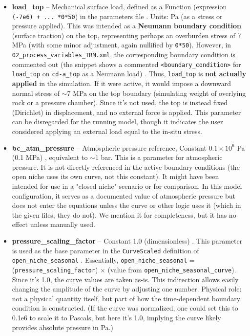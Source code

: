 \documentclass[10pt,a4paper]{article}
\begin{document}
\begin{itemize}
    \item \textbf{load\_top} -- Mechanical surface load, defined as a Function (expression \texttt{(-7e6) + ... *0*50}) in the parameters file \cite{file:03_parameters_TRM}. Units: Pa (as a stress or pressure applied). This was intended as a \textbf{Neumann boundary condition} (surface traction) on the top, representing perhaps an overburden stress of 7 MPa (with some minor adjustment, again nullified by \texttt{0*50}). However, in \texttt{02\_process\_variables\_TRM.xml}, the corresponding boundary condition is commented out (the snippet shows a commented \texttt{<boundary\_condition>} for \texttt{load\_top} on \texttt{cd-a\_top} as a Neumann load) \cite{file:02_process_variables_TRM}. Thus, \texttt{load\_top} is \textbf{not actually applied} in the simulation. If it were active, it would impose a downward normal stress of $\sim$7 MPa on the top boundary (simulating weight of overlying rock or a pressure chamber). Since it's not used, the top is instead fixed (Dirichlet) in displacement, and no external force is applied. This parameter can be disregarded for the running model, though it indicates the user considered applying an external load equal to the in-situ stress.

    \item \textbf{bc\_atm\_pressure} -- Atmospheric pressure reference, Constant $0.1 \times 10^6$ Pa (0.1 MPa) \cite{file:03_parameters_TRM}, equivalent to $\sim$1 bar. This is a parameter for atmospheric pressure. It is not directly referenced in the active boundary conditions (the open niche uses its own curve, not this constant). It might have been intended for use in a "closed niche" scenario or for comparison. In this model configuration, it serves as a documented value of atmospheric pressure but does not enter the equations unless the curve or other logic uses it (which in the given files, they do not). We mention it for completeness, but it has no effect unless manually used.

    \item \textbf{pressure\_scaling\_factor} -- Constant 1.0 (dimensionless) \cite{file:03_parameters_TRM}. This parameter is used as the base parameter in the \texttt{CurveScaled} definition of \texttt{open\_niche\_seasonal} \cite{file:03_parameters_TRM}. Essentially, \texttt{open\_niche\_seasonal} = (\texttt{pressure\_scaling\_factor}) $\times$ (value from \texttt{open\_niche\_seasonal\_curve}). Since it's 1.0, the curve values are taken as-is. This indirection allows easily changing the amplitude of the curve by adjusting one number. Physical role: not a physical quantity itself, but part of how the time-dependent boundary condition is constructed. (If the curve was normalized, one could set this to 0.1e6 to scale it to Pascals, but here it's 1.0, implying the curve likely provides absolute pressure in Pa.)
\end{itemize}
\end{document}
